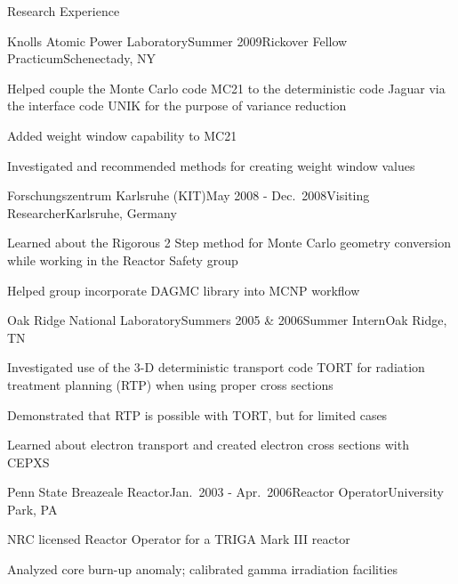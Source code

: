 \documentclass{resume2} %
\begin{document}
\begin{rSection}{Research Experience}

\begin{rSubsection}{Knolls Atomic Power Laboratory}{Summer 2009}{Rickover Fellow Practicum}{Schenectady, NY}
\item Helped couple the Monte Carlo code MC21 to the deterministic code Jaguar via the interface code UNIK for the purpose of variance reduction
\item Added weight window capability to MC21 
\item Investigated and recommended methods for creating weight window values 
\end{rSubsection}


\begin{rSubsection}{Forschungszentrum Karlsruhe (KIT)}{May 2008 - Dec.\ 2008}{Visiting Researcher}{Karlsruhe, Germany}
\item Learned about the Rigorous 2 Step method for Monte Carlo geometry conversion while working in the Reactor Safety group
\item Helped group incorporate DAGMC library into MCNP workflow
\end{rSubsection}


\begin{rSubsection}{Oak Ridge National Laboratory}{Summers 2005 \& 2006}{Summer Intern}{Oak Ridge, TN}
\item Investigated use of the 3-D deterministic transport code TORT for radiation treatment planning (RTP) when using proper cross sections
\item Demonstrated that RTP is possible with TORT, but for limited cases
\item Learned about electron transport and created electron cross sections with CEPXS
\end{rSubsection}


\begin{rSubsection}{Penn State Breazeale Reactor}{Jan.\ 2003 - Apr.\ 2006}{Reactor Operator}{University Park, PA}
\item NRC licensed Reactor Operator for a TRIGA Mark III reactor
\item Analyzed core burn-up anomaly; calibrated gamma irradiation facilities
\end{rSubsection}

\end{rSection}
\end{document}
